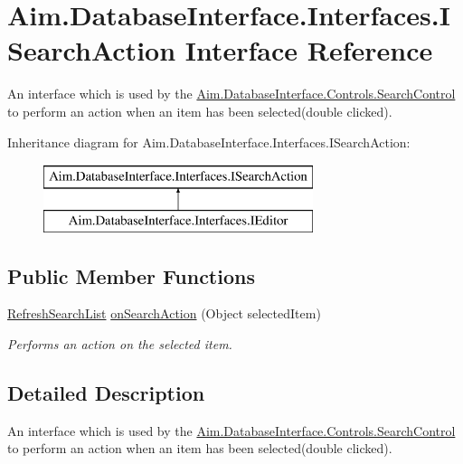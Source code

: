 \hypertarget{interface_aim_1_1_database_interface_1_1_interfaces_1_1_i_search_action}{}\section{Aim.\+Database\+Interface.\+Interfaces.\+I\+Search\+Action Interface Reference}
\label{interface_aim_1_1_database_interface_1_1_interfaces_1_1_i_search_action}


An interface which is used by the \mbox{\hyperlink{class_aim_1_1_database_interface_1_1_controls_1_1_search_control}{Aim.\+Database\+Interface.\+Controls.\+Search\+Control}} to perform an action when an item has been selected(double clicked).  


Inheritance diagram for Aim.\+Database\+Interface.\+Interfaces.\+I\+Search\+Action\+:\begin{figure}[H]
\begin{center}
\leavevmode
\includegraphics[height=2.000000cm]{interface_aim_1_1_database_interface_1_1_interfaces_1_1_i_search_action}
\end{center}
\end{figure}
\subsection*{Public Member Functions}
\begin{DoxyCompactItemize}
\item 
\mbox{\hyperlink{namespace_aim_1_1_database_interface_1_1_interfaces_aafb04e83cb5c64ff04eaca9a548186eb}{Refresh\+Search\+List}} \mbox{\hyperlink{interface_aim_1_1_database_interface_1_1_interfaces_1_1_i_search_action_ab23ff488687e962a6806ee8d0f91560c}{on\+Search\+Action}} (Object selected\+Item)
\begin{DoxyCompactList}\small\item\em Performs an action on the selected item. \end{DoxyCompactList}\end{DoxyCompactItemize}


\subsection{Detailed Description}
An interface which is used by the \mbox{\hyperlink{class_aim_1_1_database_interface_1_1_controls_1_1_search_control}{Aim.\+Database\+Interface.\+Controls.\+Search\+Control}} to perform an action when an item has been selected(double clicked). 



